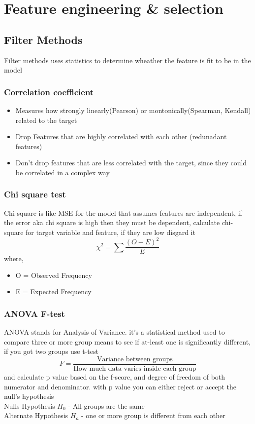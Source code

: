 \documentclass[12pt]{extarticle}
\begin{document}
\section{Feature engineering \& selection}

\subsection{Filter Methods}
Filter methods uses statistics to determine wheather the feature is fit to be
in the model 

\subsubsection{Correlation coefficient}
\begin{itemize}
    \item Measures how strongly linearly(Pearson) or montonically(Spearman, Kendall) related
to the target
    \item Drop Features that are highly correlated with each other (redunadant features)
    \item Don't drop features that are less correlated with the target, since they could be 
        correlated in a complex way 
\end{itemize}

\subsubsection{Chi square test}
Chi square is like MSE for the model that assumes features are independent, 
if the error aka chi square is high then they must be dependent, calculate
chi-square for target variable and feature, if they are low disgard it
$$ \chi^2 = \sum \frac{(O-E)^2}{E} $$
where,
\begin{itemize}
    \item O = Observed Frequency
    \item E = Expected Frequency 
\end{itemize}

\subsubsection{ANOVA F-test}
ANOVA stands for Analysis of Variance. it's a statistical method used to 
compare three or more group means to see if at-least one is significantly 
different, if you got two groups use t-test
$$F = \frac{\text{Variance between groups}}{\text{How much data varies inside each group}}$$
and calculate p value based on the f-score, and degree of freedom of both numerator and 
denominator. with p value you can either reject or accept the null's hypothesis \\
Nulls Hypothesis $H_0$ - All groups are the same\\
Alternate Hypothesis $H_a$ - one or more group is different from each other
\end{document}

